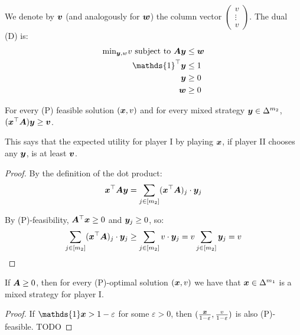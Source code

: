 	We denote by $\bm{v}$ (and analogously for $\bm{w}$) the column
	vector $\begin{pmatrix} v \\ \vdots \\ v \end{pmatrix}$. The dual (D) is:
	\begin{equation}
		\begin{split}
			\text{min}_{\vect{y}, w} v \text{ subject to }
			\vect{A} \vect{y} & \le \vect{w} \\
			\mathds{1}^\top \vect{y} & \le 1 \\
			\vect{y} & \ge 0 \\
			\vect{w} & \ge 0
		\end{split}
	\end{equation}

	\begin{fact}
		\label{fact:A}
		For every (P) feasible solution $(\bm{x}, v)$ and for every
		mixed strategy $\bm{y} \in \Delta^{m_2}$, $(\bm{x}^\top
		\bm{A})\bm{y} \ge \bm{v}$.
	\end{fact}
	
	This says that the expected utility for player I by playing
	$\bm{x}$, if player II chooses any $\bm{y}$, is at least
	$\bm{v}$.

	\begin{proof}
		By the definition of the dot product:
		\begin{equation*}
			\bm{x}^\top \bm{A} \bm{y} = \sum_{j \in [m_2]}
			(\bm{x}^\top \bm{A})_j \cdot \bm{y}_j
		\end{equation*}

		By (P)-feasibility, $\bm{A}^\top \bm{x} \ge 0$ and
		$\bm{y}_j \ge 0$, so:
		\begin{equation*}
			\sum_{j \in [m_2]} (\bm{x}^\top \bm{A})_j \cdot
			\bm{y}_j \ge \sum_{j \in [m_2]} v \cdot \bm{y}_j = v
			\sum_{j \in [m_2]} \bm{y}_j = v
		\end{equation*}
	\end{proof}

	\begin{fact}
		\label{fact:B}
		If $\bm{A} \ge 0$, then for every (P)-optimal solution
		$(\bm{x}, v)$ we have that $\bm{x} \in \Delta^{m_1}$ is a
		mixed strategy for player I.
	\end{fact}

	\begin{proof}
		If $\mathds{1} \vect{x} > 1 - \varepsilon$ for some $\varepsilon
		> 0$, then $(\frac{\bm{x}}{1-\varepsilon},
		\frac{v}{1-\varepsilon})$ is also (P)-feasible. TODO
	\end{proof}

